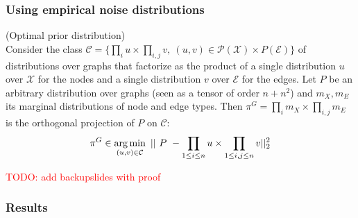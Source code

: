\documentclass[./presentation.tex]{subfiles}
\begin{document}
\begin{frame}[t,label=digress]
  \frametitle{Using empirical noise distributions}
  \begin{theorem} (Optimal prior distribution) \label{thm:optimal-limit} \\
Consider the class $\mathcal C = \{\prod_i u \times \prod_{i, j} v,~ (u, v) \in \mathcal P(\mathcal{X}) \times P(\mathcal E)\}$ of distributions over graphs that factorize as the product of a single distribution $u$ over $\mathcal X$ for the nodes and a single distribution $v$ over $\mathcal{E}$ for the edges.
Let $P$ be an arbitrary distribution over graphs (seen as a tensor of order $n + n^2$) and $m_X, m_E$ its marginal distributions of node and edge types. Then $\pi^G = \prod_i m_X \times \prod_{i, j} m_E$ is the orthogonal projection of $P$ on $\mathcal{C}$: \vspace{-0.1cm}
\[
\pi^G  \in \operatorname*{arg\,min}_{(u, v) \in \mathcal C}~ ||~P~ -  \prod_{1 \leq i \leq n} u \times \prod_{1 \leq i, j \leq n} v||^2_{2}
\]
\end{theorem}
\textcolor{red}{TODO: add backupslides with proof}
\end{frame}

\begin{frame}[label=digress]
  \frametitle{Results}
  \centering
{}
\end{frame}
\end{document}

